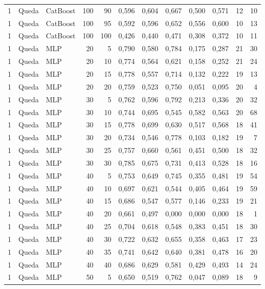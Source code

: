 \begin{longtable}{@{}rllrrrrrrrrr@{}}
1 & Queda & CatBoost & 100 & 90 & 0,596 & 0,604 & 0,667 & 0,500 & 0,571 & 12 & 10 \\
1 & Queda & CatBoost & 100 & 95 & 0,592 & 0,596 & 0,652 & 0,556 & 0,600 & 10 & 13 \\
1 & Queda & CatBoost & 100 & 100 & 0,426 & 0,440 & 0,471 & 0,308 & 0,372 & 10 & 11 \\
1 & Queda & MLP & 20 & 5 & 0,790 & 0,580 & 0,784 & 0,175 & 0,287 & 21 & 30 \\
1 & Queda & MLP & 20 & 10 & 0,774 & 0,564 & 0,621 & 0,158 & 0,252 & 21 & 24 \\
1 & Queda & MLP & 20 & 15 & 0,778 & 0,557 & 0,714 & 0,132 & 0,222 & 19 & 13 \\
1 & Queda & MLP & 20 & 20 & 0,759 & 0,523 & 0,750 & 0,051 & 0,095 & 20 & 4 \\
1 & Queda & MLP & 30 & 5 & 0,762 & 0,596 & 0,792 & 0,213 & 0,336 & 20 & 32 \\
1 & Queda & MLP & 30 & 10 & 0,744 & 0,695 & 0,545 & 0,582 & 0,563 & 20 & 68 \\
1 & Queda & MLP & 30 & 15 & 0,778 & 0,699 & 0,630 & 0,517 & 0,568 & 18 & 41 \\
1 & Queda & MLP & 30 & 20 & 0,734 & 0,546 & 0,778 & 0,103 & 0,182 & 19 & 7 \\
1 & Queda & MLP & 30 & 25 & 0,757 & 0,660 & 0,561 & 0,451 & 0,500 & 18 & 32 \\
1 & Queda & MLP & 30 & 30 & 0,785 & 0,675 & 0,731 & 0,413 & 0,528 & 18 & 16 \\
1 & Queda & MLP & 40 & 5 & 0,753 & 0,649 & 0,745 & 0,355 & 0,481 & 19 & 54 \\
1 & Queda & MLP & 40 & 10 & 0,697 & 0,621 & 0,544 & 0,405 & 0,464 & 19 & 59 \\
1 & Queda & MLP & 40 & 15 & 0,686 & 0,547 & 0,577 & 0,146 & 0,233 & 19 & 21 \\
1 & Queda & MLP & 40 & 20 & 0,661 & 0,497 & 0,000 & 0,000 & 0,000 & 18 & 1 \\
1 & Queda & MLP & 40 & 25 & 0,704 & 0,618 & 0,548 & 0,383 & 0,451 & 18 & 30 \\
1 & Queda & MLP & 40 & 30 & 0,722 & 0,632 & 0,655 & 0,358 & 0,463 & 17 & 23 \\
1 & Queda & MLP & 40 & 35 & 0,741 & 0,642 & 0,640 & 0,381 & 0,478 & 16 & 20 \\
1 & Queda & MLP & 40 & 40 & 0,686 & 0,629 & 0,581 & 0,429 & 0,493 & 14 & 24 \\
1 & Queda & MLP & 50 & 5 & 0,650 & 0,519 & 0,762 & 0,047 & 0,089 & 18 & 9 \\

\end{longtable}
